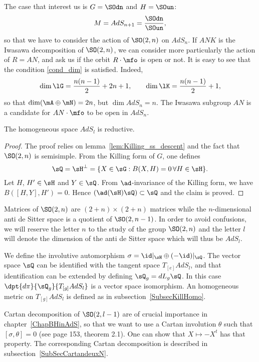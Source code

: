 The case that interest us is $G=\SOdn$ and $H=\SOun$:
\[
M=AdS_{n+1}=\dfrac{\SOdn}{\SOun},
\]
 so that we have to consider the action of $\SO(2,n)$ on $AdS_n$.  If $ANK$ is the Iwasawa decomposition of $\SO(2,n)$, we can consider more particularly the action of $R=AN$, and ask us if the orbit $R\cdot\mfo$ is open or not. It is easy to see that the condition \eqref{cond_dim} is satisfied. Indeed,
\[
 \dim\lG=\frac{n(n-1)}{2}+2n+1,\qquad\dim\lK=\frac{n(n-1)}{2}+1,
\]
so that $\dim(\mA\oplus\mN)=2n$, but $\dim AdS_n=n$. The Iwasawa subgroup $AN$ is a candidate for $AN\cdot\mfo$ to be open in $AdS_n$.

\begin{proposition}
The homogeneous space $AdS_l$ is reductive.
\label{PropAdSreduct}
\end{proposition}

\begin{proof}
The proof relies on lemma~\ref{lem:Killing_ss_descent} and the fact that $\SO(2,n)$ is semisimple. From the Killing form of $G$, one defines
\[
   \sQ=\sH^{\perp}=\{X\in\sG:B(X,H)=0\,\forall H\in\sH\}.
\]
Let $H$, $H'\in\sH$ and $Y\in\sQ$. From $\ad$-invariance of the Killing form, we have $B([H,Y],H')=0$. Hence $(\ad(\sH)\sQ)\subset \sQ$ and the claim is proved.

\end{proof}

Matrices of $\SO(2,n)$ are $(2+n)\times(2+n)$ matrices while the $n$-dimensional anti de Sitter space is a quotient of $\SO(2,n-1)$. In order to avoid confusions, we will reserve the letter $n$ to the study of the group $\SO(2,n)$ and the letter $l$ will denote the dimension of the anti de Sitter space which will thus be $AdS_l$.

We define the involutive automorphism $\sigma=\id|_{\sH}\oplus(-\id)|_{\sQ}$.  The vector space $\sQ$ can be identified with the tangent space $T_{[e]}AdS_l$, and that identification can be extended by defining $\sQ_g=dL_g\sQ$. In this case $\dpt{d\pi}{\sQ_g}{T_{[g]}AdS_l}$ is a vector space isomorphism.\label{PgdpibaseQTgM} An homogeneous metric on $T_{[g]}AdS_l$ is defined as in subsection~\ref{SubsecKillHomo}.

Cartan decomposition of $\SO(2,l-1)$ are of crucial importance in chapter~\ref{ChapBHinAdS}, so that we want to use a Cartan involution $\theta$ such that $[\sigma,\theta]=0$ (see \cite{Loos} page 153, theorem 2.1). One can show that $X\mapsto -X^t$ has that property. The corresponding Cartan decomposition is described in subsection~\ref{SubSecCartandeuxN}.

